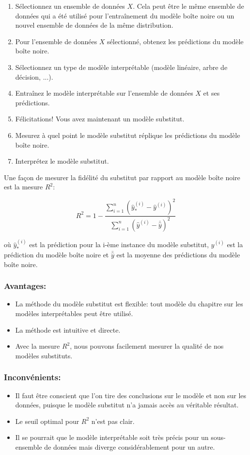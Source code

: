 \begin{enumerate}
    \item Sélectionnez un ensemble de données $X$. Cela peut être le même ensemble de données qui a été utilisé pour l'entraînement du modèle boîte noire ou un nouvel ensemble de données de la même distribution.
    \item Pour l'ensemble de données $X$ sélectionné, obtenez les prédictions du modèle boîte noire.
    \item Sélectionnez un type de modèle interprétable (modèle linéaire, arbre de décision, ...).
    \item Entraînez le modèle interprétable sur l'ensemble de données $X$ et ses prédictions.
    \item Félicitations! Vous avez maintenant un modèle substitut.
    \item Mesurez à quel point le modèle substitut réplique les prédictions du modèle boîte noire.
    \item Interprétez le modèle substitut.
\end{enumerate}

Une façon de mesurer la fidélité du substitut par rapport au modèle boîte noire est la mesure $R^2$:

\[
R^2 = 1 - \frac{\sum_{i=1}^n (\hat{y}_*^{(i)} - \hat{y}^{(i)})^2}{\sum_{i=1}^n (\hat{y}^{(i)} - \bar{\hat{y}})^2}
\]

où $\hat{y}_*^{(i)}$ est la prédiction pour la i-ème instance du modèle substitut, $\hat{y}^{(i)}$ est la prédiction du modèle boîte noire et $\bar{\hat{y}}$ est la moyenne des prédictions du modèle boîte noire.

\subsubsection{Avantages:}
\begin{itemize}
    \item La méthode du modèle substitut est flexible: tout modèle du chapitre sur les modèles interprétables peut être utilisé.
    \item La méthode est intuitive et directe.
    \item Avec la mesure $R^2$, nous pouvons facilement mesurer la qualité de nos modèles substituts.
\end{itemize}

\subsubsection{Inconvénients:}
\begin{itemize}
    \item Il faut être conscient que l'on tire des conclusions sur le modèle et non sur les données, puisque le modèle substitut n'a jamais accès au véritable résultat.
    \item Le seuil optimal pour $R^2$ n'est pas clair.
    \item Il se pourrait que le modèle interprétable soit très précis pour un sous-ensemble de données mais diverge considérablement pour un autre.
\end{itemize}



